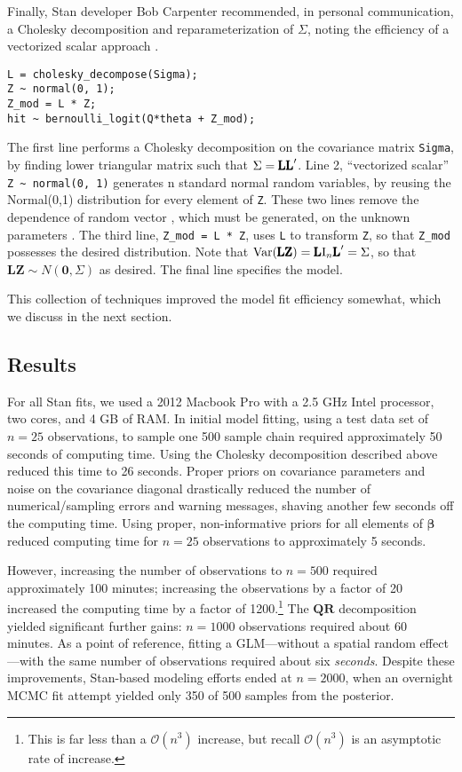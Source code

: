 Finally, Stan developer Bob Carpenter recommended, in personal communication, a Cholesky decomposition and reparameterization of $\Sigma$, noting the efficiency of a vectorized scalar approach \citep{Carpenter}.
\begin{verbatim}
L = cholesky_decompose(Sigma);  
Z ~ normal(0, 1);  
Z_mod = L * Z; 
hit ~ bernoulli_logit(Q*theta + Z_mod);
\end{verbatim}
The first line performs a Cholesky decomposition on the covariance matrix \verb|Sigma|, by finding lower triangular matrix  such that $\Sigma = \text{\pmb{LL}}'$. Line 2, ``vectorized scalar'' \verb|Z ~ normal(0, 1)| generates n standard normal random variables, by reusing the Normal(0,1) distribution for every element of \verb|Z|. These two lines remove the dependence of random vector , which must be generated, on the unknown parameters \citep{Trangucci2017}. The third line, \verb|Z_mod = L * Z|, uses \verb|L| to transform \verb|Z|, so that \verb|Z_mod| possesses the desired distribution. Note that $\text{Var}(\text{\pmb{LZ}}) = \text{\pmb{L}} \text{I}_{n}\text{\pmb{L}}' = \Sigma$, so that $\pmb{LZ} \sim N(\pmb{0}, \Sigma)$ as desired. The final line specifies the model.

This collection of techniques improved the model fit efficiency somewhat, which we discuss in the next section.

\subsection{Results}

For all Stan fits, we used a 2012 Macbook Pro with a 2.5 GHz Intel processor, two cores, and 4 GB of RAM. In initial model fitting, using a test data set of $n = 25$ observations, to sample one 500 sample chain required approximately 50 seconds of computing time. Using the Cholesky decomposition described above reduced this time to 26 seconds. Proper priors on covariance parameters and noise on the covariance diagonal drastically reduced the number of numerical/sampling errors and warning messages, shaving another few seconds off the computing time. Using proper, non-informative priors for all elements of $\pmb{\beta}$ reduced computing time for $n=25$ observations to approximately 5 seconds. 

However, increasing the number of observations to $n=500$ required approximately 100 minutes; increasing the observations by a factor of 20 increased the computing time by a factor of 1200.\footnote{This is far less than a $\mathcal{O}(n^{3})$ increase, but recall $\mathcal{O}(n^{3})$ is an asymptotic rate of increase.} The $\pmb{QR}$ decomposition yielded significant further gains: $n = 1000$ observations required about 60 minutes. As a point of reference, fitting a GLM---without a spatial random effect---with the same number of observations required about six {\it seconds}. Despite these improvements, Stan-based modeling efforts ended at $n = 2000$, when an overnight MCMC fit attempt yielded only 350 of 500 samples from the posterior.

